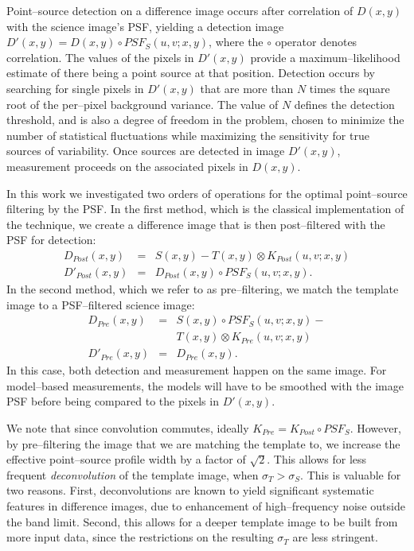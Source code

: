 \documentclass[iop]{emulateapj}
\begin{document}
Point--source detection on a difference image occurs after correlation of $D(x,y)$ with the science image's PSF, yielding a detection image $D'(x,y) = D(x,y) \circ PSF_S(u,v;x,y)$, where the $\circ$ operator denotes correlation.
The values of the pixels in $D'(x,y)$ provide a maximum--likelihood estimate of there being a point source at that position.
Detection occurs by searching for single pixels in $D'(x,y)$ that are more than $N$ times the square root of the per--pixel background variance.
The value of $N$ defines the detection threshold, and is also a degree of freedom in the problem, chosen to minimize the number of statistical fluctuations while maximizing the sensitivity for true sources of variability.
Once sources are detected in image $D'(x,y)$, measurement proceeds on the associated pixels in $D(x,y)$.

In this work we investigated two orders of operations for the optimal point--source filtering by the PSF.
In the first method, which is the classical implementation of the technique, we create a difference image that is then post--filtered with the PSF for detection:
\begin{eqnarray}
D_{Post}(x,y) & = & S(x,y) - T(x,y) \otimes K_{Post}(u,v;x,y)  \nonumber \\
D'_{Post}(x,y) & = & D_{Post}(x,y) \circ PSF_S(u,v;x,y).  \nonumber
\end{eqnarray}
In the second method, which we refer to as pre--filtering, we match the template image to a PSF--filtered science image:
\begin{eqnarray}
D_{Pre}(x,y)  & = & S(x,y) \circ PSF_S(u,v;x,y) - \nonumber \\
             &   & T(x,y) \otimes K_{Pre}(u,v;x,y) \nonumber \\
D'_{Pre}(x,y) & = & D_{Pre}(x,y). \nonumber
\end{eqnarray}
In this case, both detection and measurement happen on the same image.
For model--based measurements, the models will have to be smoothed with the image PSF before being compared to the pixels in $D'(x,y)$.

We note that since convolution commutes, ideally $K_{Pre} = K_{Post} \circ PSF_S$.
However, by pre--filtering the image that we are matching the template to, we increase the effective point--source profile width by a factor of $\sqrt{2}$.
This allows for less frequent {\it deconvolution} of the template image, when $\sigma_T > \sigma_S$.
This is valuable for two reasons.
First, deconvolutions are known to yield significant systematic features in difference images, due to enhancement of high--frequency noise outside the band limit.
Second, this allows for a deeper template image to be built from more input data, since the restrictions on the resulting $\sigma_T$ are less stringent.
\end{document}
